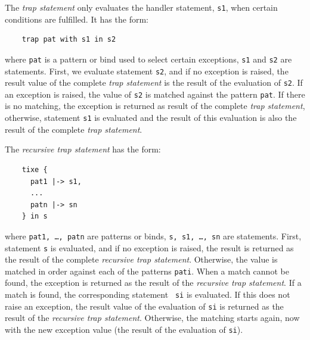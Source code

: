 \documentclass{overturerepchap}
\begin{document}
\begin{description}
  The {\it trap statement\/} only evaluates the handler statement,
{\tt s1}, when certain conditions are fulfilled. It has the form:
\begin{lstlisting} 
    trap pat with s1 in s2 
\end{lstlisting}
where {\tt pat} is a pattern or bind used to select certain
exceptions, {\tt s1} and {\tt s2} are statements. First, we evaluate
statement {\tt s2}, and if no exception is raised, the result value of
the complete {\it trap statement\/} is the result of the evaluation of
{\tt s2}. If an exception is raised, the value of {\tt s2} is matched
against the pattern {\tt pat}. If there is no matching, the exception
is returned as result of the complete {\it trap statement}, otherwise,
statement {\tt s1} is evaluated and the result of this evaluation is
also the result of the complete {\it trap statement}.

  The {\it recursive trap statement\/} has the form:
  \begin{lstlisting}
    tixe {
      pat1 |-> s1,
      ...
      patn |-> sn
    } in s
  \end{lstlisting}
  where {\tt pat1, \ldots, patn} are patterns or binds, {\tt s, s1, \ldots,
    sn} are statements. First, statement {\tt s} is evaluated, and if no
  exception is raised, the result is returned as the result of the complete
  {\it recursive trap statement}. Otherwise, the value is matched in order
  against each of the patterns {\tt pati}. When a match cannot be found,
  the exception is returned as the result of the {\it recursive trap
    statement}. If a match is found, the corresponding statement {\tt
    si} is evaluated. If this does not raise an exception, the result value
  of the evaluation of {\tt si} is returned as the result of the {\it
    recursive trap statement}. Otherwise, the matching starts again, now
  with the new exception value (the result of the evaluation of {\tt si}).


\end{description}
\end{document}
